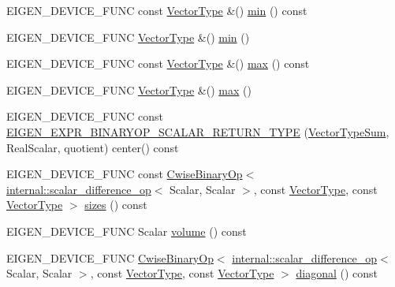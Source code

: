 \begin{DoxyCompactItemize}
\item 
E\+I\+G\+E\+N\+\_\+\+D\+E\+V\+I\+C\+E\+\_\+\+F\+U\+NC const \mbox{\hyperlink{class_eigen_1_1_matrix}{Vector\+Type}} \&() \mbox{\hyperlink{class_eigen_1_1_aligned_box_a4b23dedc65215a939c1794f83017c58d}{min}} () const
\item 
E\+I\+G\+E\+N\+\_\+\+D\+E\+V\+I\+C\+E\+\_\+\+F\+U\+NC \mbox{\hyperlink{class_eigen_1_1_matrix}{Vector\+Type}} \&() \mbox{\hyperlink{class_eigen_1_1_aligned_box_a36f4c48fdbf74637e54422b9c386f24d}{min}} ()
\item 
E\+I\+G\+E\+N\+\_\+\+D\+E\+V\+I\+C\+E\+\_\+\+F\+U\+NC const \mbox{\hyperlink{class_eigen_1_1_matrix}{Vector\+Type}} \&() \mbox{\hyperlink{class_eigen_1_1_aligned_box_ad10b1fa3021f705e3104d09b8842c37e}{max}} () const
\item 
E\+I\+G\+E\+N\+\_\+\+D\+E\+V\+I\+C\+E\+\_\+\+F\+U\+NC \mbox{\hyperlink{class_eigen_1_1_matrix}{Vector\+Type}} \&() \mbox{\hyperlink{class_eigen_1_1_aligned_box_a1a49b1c085de932a5dd36faf92b8f4de}{max}} ()
\item 
E\+I\+G\+E\+N\+\_\+\+D\+E\+V\+I\+C\+E\+\_\+\+F\+U\+NC const \mbox{\hyperlink{class_eigen_1_1_aligned_box_a53e595641b2d163739098a1983db5414}{E\+I\+G\+E\+N\+\_\+\+E\+X\+P\+R\+\_\+\+B\+I\+N\+A\+R\+Y\+O\+P\+\_\+\+S\+C\+A\+L\+A\+R\+\_\+\+R\+E\+T\+U\+R\+N\+\_\+\+T\+Y\+PE}} (\mbox{\hyperlink{class_eigen_1_1_cwise_binary_op}{Vector\+Type\+Sum}}, Real\+Scalar, quotient) center() const
\item 
E\+I\+G\+E\+N\+\_\+\+D\+E\+V\+I\+C\+E\+\_\+\+F\+U\+NC const \mbox{\hyperlink{class_eigen_1_1_cwise_binary_op}{Cwise\+Binary\+Op}}$<$ \mbox{\hyperlink{struct_eigen_1_1internal_1_1scalar__difference__op}{internal\+::scalar\+\_\+difference\+\_\+op}}$<$ Scalar, Scalar $>$, const \mbox{\hyperlink{class_eigen_1_1_matrix}{Vector\+Type}}, const \mbox{\hyperlink{class_eigen_1_1_matrix}{Vector\+Type}} $>$ \mbox{\hyperlink{class_eigen_1_1_aligned_box_a139c2e08625f54e4c6b0007257afdae2}{sizes}} () const
\item 
E\+I\+G\+E\+N\+\_\+\+D\+E\+V\+I\+C\+E\+\_\+\+F\+U\+NC Scalar \mbox{\hyperlink{class_eigen_1_1_aligned_box_af737027346c35a1c3027d36c9c891dc5}{volume}} () const
\item 
E\+I\+G\+E\+N\+\_\+\+D\+E\+V\+I\+C\+E\+\_\+\+F\+U\+NC \mbox{\hyperlink{class_eigen_1_1_cwise_binary_op}{Cwise\+Binary\+Op}}$<$ \mbox{\hyperlink{struct_eigen_1_1internal_1_1scalar__difference__op}{internal\+::scalar\+\_\+difference\+\_\+op}}$<$ Scalar, Scalar $>$, const \mbox{\hyperlink{class_eigen_1_1_matrix}{Vector\+Type}}, const \mbox{\hyperlink{class_eigen_1_1_matrix}{Vector\+Type}} $>$ \mbox{\hyperlink{class_eigen_1_1_aligned_box_a37ff7dfbe2d9aff6920c7f92b02af8d4}{diagonal}} () const

\end{DoxyCompactItemize}
